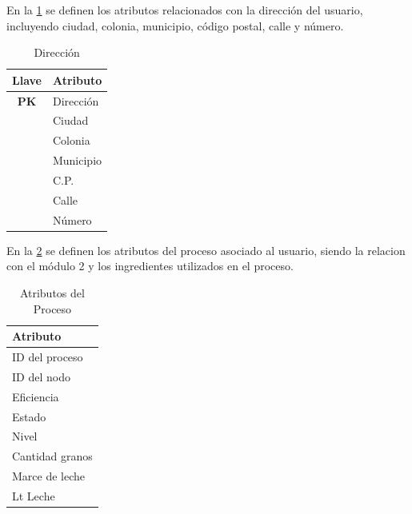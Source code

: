 En la \cref{tab:Dirección} se definen los atributos relacionados con la dirección
del usuario, incluyendo ciudad, colonia, municipio, código postal, calle y número.

\begin{table}[H]
    \centering
    \caption{Dirección} %
    \label{tab:Dirección}
    \footnotesize %

    \begin{tabular}{|c|>{\raggedright\arraybackslash}p{2.5cm}|}
        \hline
        \textbf{Llave}    & \textbf{Atributo}  \\ \hline
         \textbf{PK} & Dirección   \\ \hline
        & Ciudad                 \\ \hline
        & Colonia                 \\ \hline
        & Municipio               \\ \hline
        & C.P.                    \\ \hline
        & Calle                   \\ \hline
        & Número                  \\ \hline  
    \end{tabular}
\end{table}

En la \cref{tab:atributoProceso} se definen los atributos del proceso asociado al usuario,
siendo la relacion con
el módulo 2 y los ingredientes utilizados en el proceso.

\begin{table}[H]
    \centering
    \caption{Atributos del Proceso}%
    \label{tab:atributoProceso}
    \footnotesize %

    \begin{tabular}{|>{\raggedright\arraybackslash}p{2.5cm}|}
        \hline
         \textbf{Atributo}    \\ \hline
        ID del proceso               \\ \hline
        ID del nodo                                  \\ \hline
        Eficiencia                                       \\ \hline
        Estado                                           \\ \hline
        Nivel                                            \\ \hline
        Cantidad granos                                           \\ \hline
        Marce de leche                                            \\ \hline
        Lt Leche                                           \\ \hline
    \end{tabular}
\end{table}

